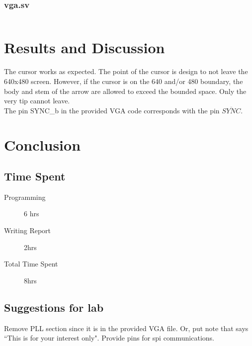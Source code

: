 \documentclass[11pt]{article}
\begin{document}
\subsubsection{vga.sv}

\begin{lstlisting}[numbers=left,language=C,basicstyle=\footnotesize]

\end{lstlisting}

\clearpage


\section{Results and Discussion}

The cursor works as expected. The point of the cursor is design to not leave the 640x480 screen. However, if the cursor is on the 640 and/or 480 boundary, the body and stem of the arrow are allowed to exceed the bounded space. Only the very tip cannot leave. \\

The pin SYNC\_b in the provided VGA code corresponds with the pin $\overline{SYNC}$. 


\section{Conclusion}

\subsection{Time Spent}

\begin{description}
	\item[Programming] 6 hrs
 	\item[Writing Report] 2hrs
	\item[Total Time Spent] 8hrs
\end{description}

\subsection{Suggestions for lab}

Remove PLL section since it is in the provided VGA file. Or, put note that says ``This is for your interest only".
Provide pins for spi communications. \\ 
\end{document}
